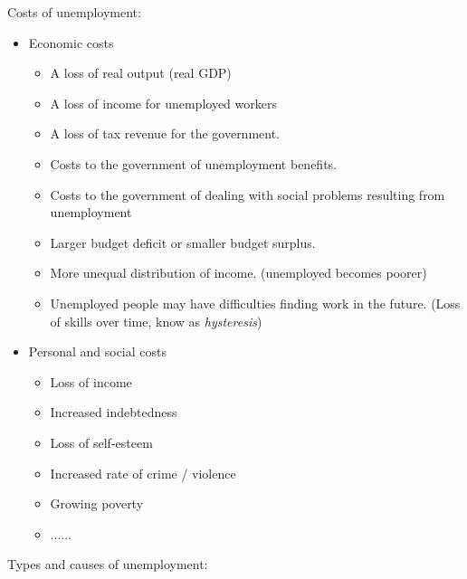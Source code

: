 Costs of unemployment:
\begin{itemize}
  \item Economic costs
  \begin{itemize}
    \item A loss of real output (real GDP)
    \item A loss of income for unemployed workers
    \item A loss of tax revenue for the government. 
    \item Costs to the government of unemployment benefits.
    \item Costs to the government of dealing with social problems resulting from unemployment
    \item Larger budget deficit or smaller budget surplus.
    \item More unequal distribution of income. (unemployed becomes poorer)
    \item Unemployed people may have difficulties finding work in the future. (Loss of skills over time, know as \textit{hysteresis})
  \end{itemize}
  \item Personal and social costs
  \begin{itemize}
    \item Loss of income
    \item Increased indebtedness 
    \item Loss of self-esteem
    \item Increased rate of crime / violence
    \item Growing poverty
    \item ......
  \end{itemize}
\end{itemize}
Types and causes of unemployment:
